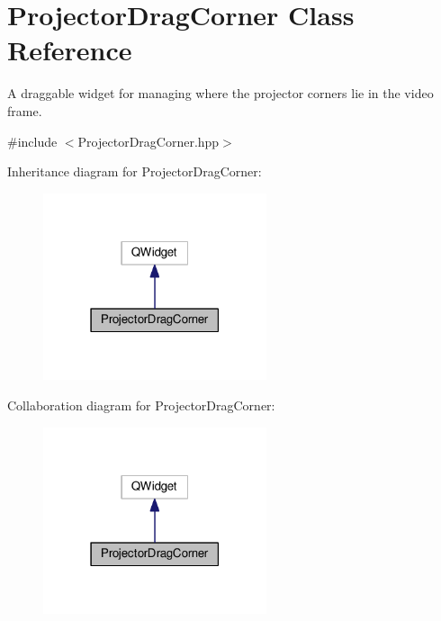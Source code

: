 \hypertarget{classProjectorDragCorner}{}\section{Projector\+Drag\+Corner Class Reference}
\label{classProjectorDragCorner}


A draggable widget for managing where the projector corners lie in the video frame.  




{\ttfamily \#include $<$Projector\+Drag\+Corner.\+hpp$>$}



Inheritance diagram for Projector\+Drag\+Corner\+:\nopagebreak
\begin{figure}[H]
\begin{center}
\leavevmode
\includegraphics[width=186pt]{classProjectorDragCorner__inherit__graph}
\end{center}
\end{figure}


Collaboration diagram for Projector\+Drag\+Corner\+:\nopagebreak
\begin{figure}[H]
\begin{center}
\leavevmode
\includegraphics[width=186pt]{classProjectorDragCorner__coll__graph}
\end{center}
\end{figure}
